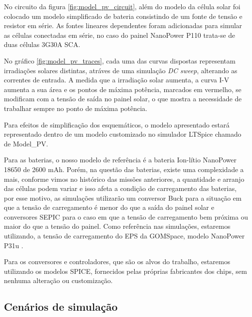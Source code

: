 No circuito da figura \ref{fig:model_pv_circuit}, além do modelo da célula solar foi colocado um modelo simplificado de bateria consistindo de um fonte de tensão e resistor em série. As fontes lineares dependentes foram adicionadas para simular as células conectadas em série, no caso do painel NanoPower P110 trata-se de duas células 3G30A SCA.

No gráfico \ref{fig:model_pv_traces}, cada uma das curvas dispostas representam irradiações solares distintas, atráves de uma simulação \textit{DC sweep}, alterando as correntes de entrada. A medida que a irradiação solar aumenta, a curva I-V aumenta a sua área e os pontos de máxima potência, marcados em vermelho, se modificam com a tensão de saída no painel solar, o que mostra a necessidade de trabalhar sempre no ponto de máxima potência.  

Para efeitos de simplificação dos esquemáticos, o modelo apresentado estará representado dentro de um modelo customizado no simulador LTSpice chamado de Model\_PV.

Para as baterias, o nosso modelo de referência \cite{battery_gomspace_datasheet} é a bateria Ion-lítio NanoPower 18650 de 2600 mAh. Porém, na questão das baterias, existe uma complexidade a mais, conforme vimos no histórico das missões anteriores, a quantidade e arranjo das células podem variar e isso afeta a condição de carregamento das baterias, por esse motivo, as simulações utilizarão um conversor Buck para a situação em que a tensão de carregamento é menor do que a saída do painel solar e conversores SEPIC para o caso em que a tensão de carregamento bem próxima ou maior do que a tensão do painel. Como referência nas simulações, estaremos utilizando, a tensão de carregamento do EPS da GOMSpace, modelo NanoPower P31u \cite{eps_gomspace_datasheet}.

Para os conversores e controladores, que são os alvos do trabalho, estaremos utilizando os modelos SPICE, fornecidos pelas próprias fabricantes dos chips, sem nenhuma alteração ou customização. 

\subsection*{Cenários de simulação}

